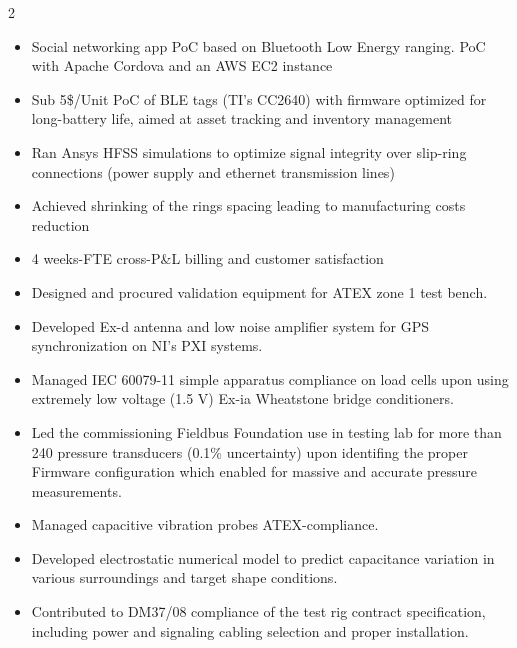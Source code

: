 \documentclass[9.5pt,a4paper,ragged2e,withhyper]{altacv} %
\begin{document}
\begin{paracol}{2}
\begin{itemize}
\item Social networking app PoC based on Bluetooth Low Energy ranging. PoC with Apache
Cordova and an AWS EC2 instance
\end{itemize}
\divider

\begin{itemize}
\item Sub 5\$/Unit PoC of BLE tags (TI's CC2640) with firmware optimized for long-battery
life, aimed at asset tracking and inventory management
\end{itemize}
\divider

\begin{itemize}
\item Ran Ansys HFSS simulations to optimize signal integrity over slip-ring connections
(power supply and ethernet transmission lines) 
\item Achieved shrinking of the rings spacing leading to manufacturing costs reduction
\item 4 weeks-FTE cross-P\&L billing and customer satisfaction
\end{itemize}
\divider

\begin{itemize}
\item Designed and procured validation equipment for ATEX zone 1 test bench. 
\item Developed Ex-d antenna and low noise amplifier system for GPS synchronization on NI's PXI systems. 
\item Managed IEC 60079-11 simple apparatus compliance on load cells upon using
extremely low voltage (1.5 V) Ex-ia Wheatstone bridge conditioners.
\end{itemize}
\divider

\begin{itemize}
\item Led the commissioning Fieldbus Foundation use in testing lab for more than 240 pressure transducers (0.1\% uncertainty) 
upon identifing the proper Firmware configuration which enabled for massive and accurate pressure measurements.
\item Managed capacitive vibration probes ATEX-compliance. 
\item Developed electrostatic numerical model to predict capacitance variation in various surroundings and target shape conditions. 
\item Contributed to DM37/08 compliance of the test rig contract specification, including power and signaling cabling selection and proper installation.
\end{itemize}
\divider


\end{paracol}
\end{document}
